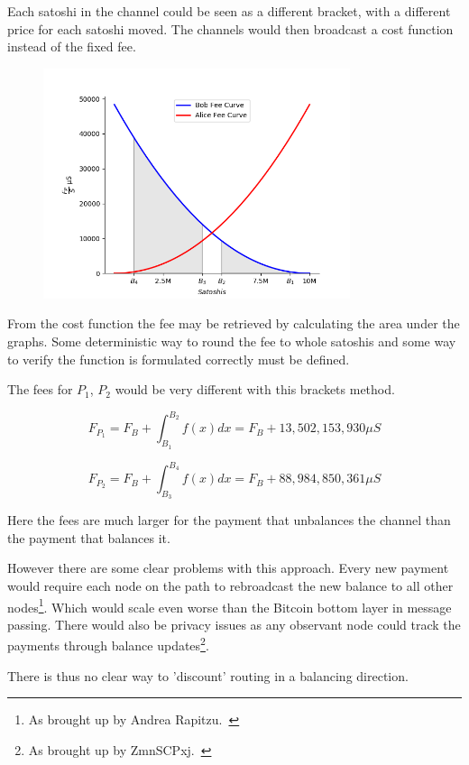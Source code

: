 Each satoshi in the channel could be seen as a different bracket, with a different price for each satoshi moved. The channels would then broadcast a cost function instead of the fixed fee.

\begin{figure}[!htb]
	\hspace*{-0.5cm}
	\centering
	\includegraphics[width=9cm]{images/fee_scheme.png}
	\label{fig:fee scheme}
	\hspace{2mm}
\end{figure}

From the cost function the fee may be retrieved by calculating the area under the graphs. Some deterministic way to round the fee to whole satoshis and some way to verify the function is formulated correctly must be defined. 

The fees for $P_1$, $P_2$ would be very different with this brackets method.

\[ F_{P_1} = F_{B} + \int_{B_1}^{B_2} f(x) dx = F_B + 13,502,153,930 \mu S \] 

\[ F_{P_2} = F_{B} + \int_{B_3}^{B_4} f(x) dx  = F_B + 88,984,850,361 \mu S \]

Here the fees are much larger for the payment that unbalances the channel than the payment that balances it. 

However there are some clear problems with this approach. Every new payment would require each node on the path to rebroadcast the new balance to all other nodes\footnote{As brought up by Andrea Rapitzu.~\cite{raspitzu:fee}}. Which would scale even worse than the Bitcoin bottom layer in message passing. There would also be privacy issues as any observant node could track the payments through balance updates\footnote{As brought up by ZmnSCPxj.~\cite{ZmnSCPxj:fee}}.

There is thus no clear way to 'discount' routing in a balancing direction.

